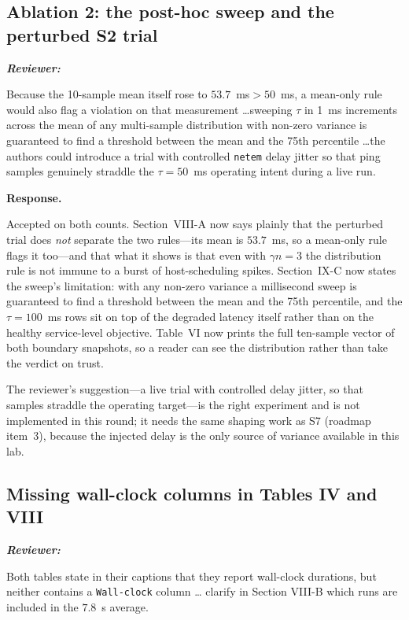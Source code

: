 \documentclass[11pt,a4paper]{article}
\newenvironment{reviewer}{\par\medskip\noindent\begin{minipage}{\linewidth}\small\itshape\color{quote}\textbf{Reviewer:}\par}{\end{minipage}\medskip\par}
\newenvironment{response}{\par\noindent\begin{minipage}{\linewidth}\small\textbf{Response.}\par}{\end{minipage}\medskip\par}
\begin{document}
\subsection{Ablation 2: the post-hoc sweep and the perturbed S2 trial}

\begin{reviewer}
Because the 10-sample mean itself rose to $53.7$~ms$>50$~ms, a mean-only
rule would also flag a violation on that measurement \dots sweeping $\tau$
in 1~ms increments across the mean of any multi-sample distribution with
non-zero variance is guaranteed to find a threshold between the mean and
the 75th percentile \dots the authors could introduce a trial with
controlled \texttt{netem} delay jitter so that ping samples genuinely
straddle the $\tau=50$~ms operating intent during a live run.
\end{reviewer}

\begin{response}
Accepted on both counts. Section~VIII-A now says plainly that the
perturbed trial does \emph{not} separate the two rules---its mean is
$53.7$~ms, so a mean-only rule flags it too---and that what it shows is
that even with $\gamma n=3$ the distribution rule is not immune to a burst
of host-scheduling spikes. Section~IX-C now states the sweep's
limitation: with any non-zero variance a millisecond sweep is guaranteed
to find a threshold between the mean and the 75th percentile, and the
$\tau=100$~ms rows sit on top of the degraded latency itself rather than
on the healthy service-level objective. Table~VI now prints the full
ten-sample vector of both boundary snapshots, so a reader can see the
distribution rather than take the verdict on trust.

The reviewer's suggestion---a live trial with controlled delay jitter, so
that samples straddle the operating target---is the right experiment and
is not implemented in this round; it needs the same shaping work as S7
(roadmap item~3), because the injected delay is the only source of
variance available in this lab.
\end{response}

\subsection{Missing wall-clock columns in Tables IV and VIII}

\begin{reviewer}
Both tables state in their captions that they report wall-clock
durations, but neither contains a \texttt{Wall-clock} column \dots
clarify in Section VIII-B which runs are included in the $7.8$~s average.
\end{reviewer}
\end{document}
